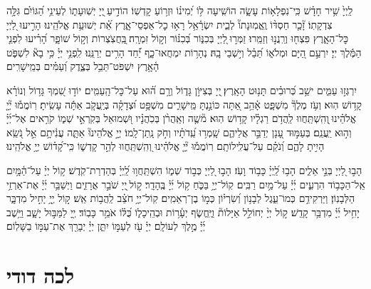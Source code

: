 \documentclass[twoside, openany, parskip=half, 11pt]{book}
\begin{document}
לַֽיְיָ֙ שִׁ֥יר חָדָ֗שׁ כִּֽי־נִפְלָא֥וֹת עָשָׂ֑ה הוֹשִֽׁיעָה לּ֥וֹ יְ֝מִינ֗וֹ וּזְר֥וֹעַ קָדְשֽׁוֹ׃
הוֹדִ֣יעַ ֖יְיָ יְשֽׁוּעָת֑וֹ לְעֵינֵ֥י הַ֝גּוֹיִ֗ם גִּלָּ֥ה צִדְקָתֽוֹ׃
זָ֘כַ֤ר חַסְדּ֨וֹ וֶֽאֱמֽוּנָתוֹ֘ לְבֵ֢ית יִשְׂרָ֫אֵ֥ל רָא֥וּ כׇל־אַפְסֵי־אָ֑רֶץ אֵ֝֗ת יְשׁוּעַ֥ת אֱלֹהֵֽינוּ׃
הָרִ֣יעוּ לַ֭יְיָ כׇּל־הָאָ֑רֶץ פִּצְח֖וּ וְרַֽנֲנ֣וּ וְזַמֵּֽרוּ׃
זַמְּר֣וּ ֖לַיְיָ בְּכִנּ֑וֹר בְּ֝כִנּ֗וֹר וְק֣וֹל זִמְרָֽה׃
֖בַּֽחֲצֹֽצְרוֹת וְק֣וֹל שׁוֹפָ֑ר הָ֝רִ֗יעוּ לִפְנֵ֤י הַמֶּ֬לֶךְ יְיָ׃
יִרְעַ֣ם הַ֭יָּם וּמְלֹא֑וֹ תֵּ֝בֵ֗ל וְי֣שְׁבֵי בָֽהּ׃
נְהָר֥וֹת יִמְחֲאוּ־כָ֑ף יַ֝֗חַד הָרִ֥ים יְרַנֵּֽנוּ׃
לִֽפְנֵ֥י יְיָ֗ כִּ֥י בָא֘ לִשְׁפֹּ֢ט הָ֫אָ֥רֶץ יִשְׁפֹּט־תֵּבֵ֥ל בְּצֶ֑דֶק וְ֝עַמִּ֗ים בְּמֵֽישָׁרִֽים׃

יִרְגְּז֣וּ עַמִּ֑ים ישֵׁ֥ב כְּ֝רוּבִ֗ים תָּנ֥וּט הָאָֽרֶץ׃
֖יְיָ בְּצִיּוֹ֣ן גָּד֑וֹל וְרָ֥ם ה֝֗וּא עַל־כׇּל־הָֽעַמִּֽים׃
יוֹד֣וּ שִׁ֭מְךָ גָּד֥וֹל וְנוֹרָ֗א קָד֥וֹשׁ הֽוּא׃
וְעֹ֥ז מֶלֶךְ֘ מִשְׁפָּ֢ט אָ֫הֵ֥ב אַ֭תָּה כּוֹנַ֣נְתָּ מֵּֽישָׁרִ֑ים מִשְׁפָּ֥ט וּ֝צְדָקָ֗ה בְּיַֽעֲקֹ֤ב אַתָּ֬ה עָשִֽׂיתָ׃
רֽוֹמֲמ֡וּ יְ֘יָ֤ אֱלֹהֵ֗ינוּ ֖וְהִֽשְׁתַּֽחֲווּ לַֽהֲדֹ֥ם רַגְלָ֗יו קָד֥וֹשׁ הֽוּא׃
מ֘שֶׁ֤ה וְאַֽהֲרֹ֨ן בְּכֹֽהֲנָ֗יו וּ֭שְׁמוּאֵל בְּקֹֽרְאֵ֣י שְׁמ֑וֹ קֹרִ֥אים אֶל־יְ֜יָ֗ וְה֣וּא יַֽעֲנֵֽם׃
בְּעַמּ֣וּד עָ֭נָן יְדַבֵּ֣ר אֲלֵיהֶ֑ם שָֽׁמְר֥וּ עֵֽ֝דֹתָ֗יו וְחֹ֣ק נָֽתַן־לָֽמוֹ׃
יְיָ֣ אֱלֹהֵינוּ֘ אַתָּ֢ה עֲנִ֫יתָ֥ם אֵ֣ל נֹ֭שֵֽׂא הָיִ֣יתָ לָהֶ֑ם וְ֝נֹקֵ֗ם עַל־עֲלִֽילוֹתָֽם׃
רֽוֹמֲמ֡וּ יְ֘יָ֤ אֱלֹהֵ֗ינוּ וְ֭הִֽשְׁתַּֽחֲווּ לְהַ֣ר קָדְשׁ֑וֹ כִּֽי־קָ֝ד֗וֹשׁ יְיָ֥ אֱלֹהֵֽינוּ׃

הָב֣וּ לַ֭יְיָ בְּנֵ֣י אֵלִ֑ים הָב֥וּ לַֽ֝יְיָ֗ כָּב֥וֹד וָעֹֽז׃
הָב֣וּ לַ֭יְיָ כְּב֣וֹד שְׁמ֑וֹ הִשְׁתַּֽחֲו֥וּ לַֽ֝יְיָ֗ בְּהַדְרַת־קֹֽדֶשׁ׃
ק֥וֹל יְיָ֗ עַל־הַ֫מָּ֥יִם אֵֽל־הַכָּב֥וֹד הִרְעִ֑ים יְ֜יָ֗ עַל־מַ֥יִם רַבִּֽים׃
קֽוֹל־יְיָ֥ בַּכֹּ֑חַ ק֥וֹל יְ֜יָ֗ בֶּֽהָדָֽר׃
ק֣וֹל ֖יְיָ שֹׁבֵ֣ר אֲרָזִ֑ים וַיְשַׁבֵּ֥ר יְ֜יָ֗ אֶת־אַרְזֵ֥י הַלְּבָנֽוֹן׃
וַיַּרְקִידֵ֥ם כְּמוֹ־עֵ֑גֶל לְבָנ֥וֹן וְ֝שִׂרְי֗וֹן כְּמ֣וֹ בֶן־רְאֵמִֽים׃
קֽוֹל־יְיָ֥ חֹצֵ֗ב לַֽהֲב֥וֹת אֵֽשׁ׃
ק֣וֹל יְ֖יָ֥ יָחִ֣יל מִדְבָּ֑ר יָחִ֥יל יְ֜יָ֗ מִדְבַּ֥ר קָדֵֽשׁ׃
ק֣וֹל יְיָ֨ יְחוֹלֵ֣ל אַיָּלוֹת֘ וַיֶּֽחֱשׂ֢ף יְעָ֫ר֥וֹת וּבְהֵֽיכָל֑וֹ כֻּ֝לּ֗וֹ אֹמֵ֥ר כָּבֽוֹד׃
יְ֖יָ לַמַּבּ֣וּל יָשָׁ֑ב וַיֵּ֥שֶׁב יְ֜יָ֗ מֶ֣לֶךְ לְעוֹלָֽם׃
יְיָ֗ עֹ֖ז לְעַמּ֣וֹ יִתֵּ֑ן יְיָ֓ יְבָרֵ֖ךְ אֶת־עַמּ֣וֹ בַשָּׁלֽוֹם׃


\section*{ לכה דודי }

\newcommand{\lechadodi}{\textbf{לְכָה דוֹדִי לִקְרַאת כַּלָּה פְּנֵי שַׁבָּת נְקַבְּלָה׃}}
\end{document}
